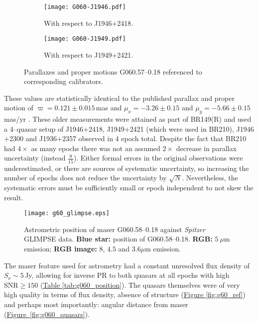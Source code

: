             \begin{figure}[h]
            	\centering
            	\begin{subfigure}[t]{0.9\textwidth}
            		\texttt{[image: G060-J1946.pdf]}
            		\caption{With respect to J1946$+$2418.}
            	\end{subfigure}
            	\vfill
            	\begin{subfigure}[t]{0.9\textwidth}
            		\texttt{[image: G060-J1949.pdf]}
            		\caption{With respect to  J1949$+$2421.}
            	\end{subfigure}
            	\caption[G060.57--0.18 Parallax Fit]{Parallaxes and proper motions G060.57--0.18 referenced to corresponding calibrators.}
            	\label{fig:per_g060parallax}
            \end{figure}
           
            These values are statistically identical to the published parallax and proper motion of $\varpi=0.121\pm0.015$\,mas and $\mu_x=-3.26\pm0.15$ and $\mu_y=-5.66\pm0.15$\,mas/yr \citep{Reid2019}. These older measurements were attained as part of BR149(R) and used a 4--quasar setup of J1946$+$2418, J1949$+$2421 (which were used in BR210), J1946$+$2300 and J1936$+$2357 observed in 4 epoch total. Despite the fact that BR210 had $4\times$ as many epochs there was not an assumed $2\times$ decrease in parallax uncertainty (instead $\frac{9}{15}$). Either formal errors in the original observations were underestimated, or there are sources of systematic uncertainty, so increasing the number of epochs does not reduce the uncertainty by $\sqrt{N}$.  Nevertheless, the systematic errors must be sufficiently small or epoch independent to not skew the result.
                        
			\begin{SCfigure}[][h]
				\centering
				\texttt{[image: g60\_glimpse.eps]}
				\caption[G060.58--0.18 Sky position]{Astrometric position of \choh\space maser G060.58--0.18 against {\it Spitzer} GLIMPSE data. \textbf{Blue star:} position of G060.58--0.18. \textbf{RGB:} $5~\mu$m emission; \textbf{RGB image:} $8$, $4.5$ and $3.6\mu$m emission.} \label{fig:g060_glimpse}
			\end{SCfigure}
			
            The maser feature used for astrometry had a constant unresolved flux density of $S_\nu\sim5$\,Jy, allowing for inverse PR to both quasars at all epochs with high $\text{SNR}\ge150$ (\hyperref[tab:g060_position]{Table \ref*{tab:g060_position}}). The quasars themselves were of very high quality in terms of flux density, absence of structure (\hyperref[fig:g60_ref]{Figure \ref*{fig:g60_ref}}) and perhaps most importantly: angular distance from maser (\hyperref[fig:g060_quasars]{Figure~\ref*{fig:g060_quasars}}). 
            
